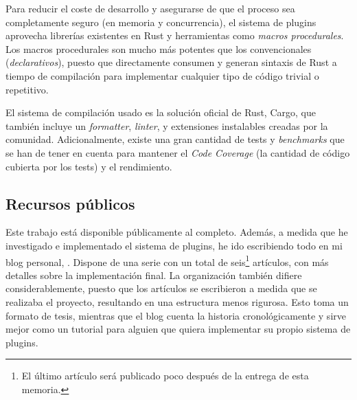 Para reducir el coste de desarrollo y asegurarse de que el proceso sea
completamente seguro (en memoria y concurrencia), el sistema de plugins
aprovecha librerías existentes en Rust y herramientas como \emph{macros
procedurales}. Los macros procedurales son mucho más potentes que los
convencionales (\emph{declarativos}), puesto que directamente consumen y generan
sintaxis de Rust a tiempo de compilación para implementar cualquier tipo de
código trivial o repetitivo.

El sistema de compilación usado es la solución oficial de Rust, Cargo, que
también incluye un \emph{formatter}, \emph{linter}, y extensiones instalables
creadas por la comunidad. Adicionalmente, existe una gran cantidad de tests y
\emph{benchmarks} que se han de tener en cuenta para mantener el \emph{Code
Coverage} (la cantidad de código cubierta por los tests) y el rendimiento.

\subsection{Recursos públicos}

Este trabajo está disponible públicamente al completo. Además, a medida que he
investigado e implementado el sistema de plugins, he ido escribiendo todo en mi
blog personal, . Dispone de una serie con un total de
seis\footnote{El último artículo será publicado poco después de la entrega de
esta memoria.} artículos, con más detalles sobre la implementación final. La
organización también difiere considerablemente, puesto que los artículos se
escribieron a medida que se realizaba el proyecto, resultando en una estructura
menos rigurosa. Esto toma un formato de tesis, mientras que el blog cuenta la
historia cronológicamente y sirve mejor como un tutorial para alguien que quiera
implementar su propio sistema de plugins.

